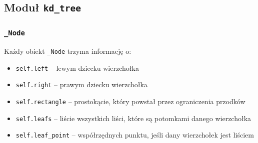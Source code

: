 \documentclass[11pt]{scrartcl}
\begin{document}
\newpage

\subsection{Moduł \texttt{kd\_tree}}

\subsubsection{\texttt{\_Node}}
Każdy obiekt \texttt{\_Node} trzyma informację o:
\begin{itemize}
    \item \texttt{self.left} -- lewym dziecku wierzchołka
    \item \texttt{self.right} -- prawym dziecku wierzchołka
    \item \texttt{self.rectangle} -- prostokącie, który powstał przez ograniczenia przodków
    \item \texttt{self.leafs} -- liście wszystkich liści, które są potomkami danego wierzchołka
    \item \texttt{self.leaf\_point} -- współrzędnych punktu, jeśli dany wierzchołek jest liściem
\end{itemize}
\end{document}
